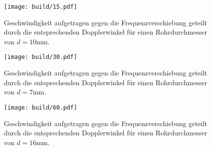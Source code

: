 \begin{figure}[H]
  \centering
  \texttt{[image: build/15.pdf]}
  \caption{Geschwindigkeit aufgetragen gegen die Frequenzverschiebung geteilt durch die entsprechenden Dopplerwinkel für einen Rohrdurchmesser von $d= 10\si{\milli\meter}$.}
  \label{fig:15}
\end{figure}

\begin{figure}[H]
  \centering
  \texttt{[image: build/30.pdf]}
  \caption{Geschwindigkeit aufgetragen gegen die Frequenzverschiebung geteilt durch die entsprechenden Dopplerwinkel für einen Rohrdurchmesser von $d= 7\si{\milli\meter}$.}
  \label{fig:30}
\end{figure}

\begin{figure}[H]
  \centering
  \texttt{[image: build/60.pdf]}
  \caption{Geschwindigkeit aufgetragen gegen die Frequenzverschiebung geteilt durch die entsprechenden Dopplerwinkel für einen Rohrdurchmesser von $d= 16\si{\milli\meter}$.}
  \label{fig:60}
\end{figure}



